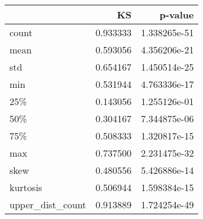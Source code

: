 \begin{tabular}{lrr}
\toprule
{} &        KS &       p-value \\
\midrule
count            &  0.933333 &  1.338265e-51 \\
mean             &  0.593056 &  4.356206e-21 \\
std              &  0.654167 &  1.450514e-25 \\
min              &  0.531944 &  4.763336e-17 \\
25\%              &  0.143056 &  1.255126e-01 \\
50\%              &  0.304167 &  7.344875e-06 \\
75\%              &  0.508333 &  1.320817e-15 \\
max              &  0.737500 &  2.231475e-32 \\
skew             &  0.480556 &  5.426886e-14 \\
kurtosis         &  0.506944 &  1.598384e-15 \\
upper\_dist\_count &  0.913889 &  1.724254e-49 \\
\bottomrule
\end{tabular}
